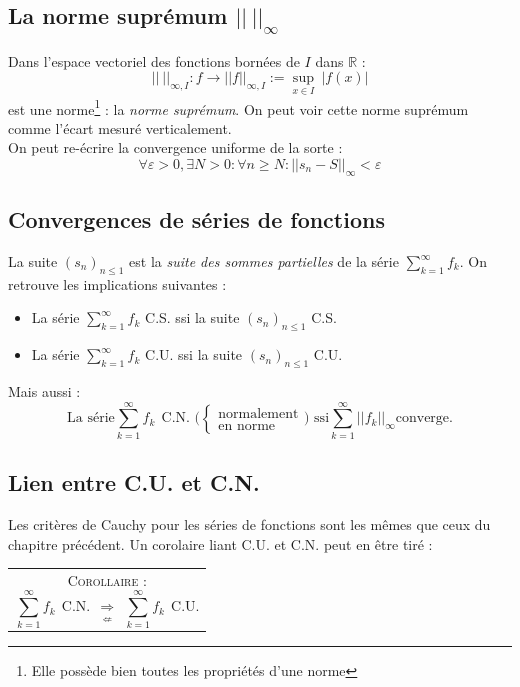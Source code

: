 \documentclass	[11pt, a4paper, openany]{book}
\newcommand{\corollaire}[1]{\ \\\begin{tabular}{|c}
\begin{minipage}{\textwidth}
  \textsc{Corollaire : } \textit{#1}
\end{minipage}
\end{tabular}}
\newcommand{\serie}{\sum_{k=1}^\infty}
\begin{document}
\subsection{La norme suprémum $||\ ||_\infty$}
Dans l'espace vectoriel des fonctions bornées de $I$ dans $\mathbb{R}$ :
\begin{equation}
||\ ||_{\infty, I} : f \rightarrow ||f||_{\infty, I} := \sup\limits_{x \in I}\ |f(x)|
\end{equation}
est une norme\footnote{Elle possède bien toutes les propriétés d'une norme} : la \textit{norme suprémum}. On peut voir cette norme suprémum comme l'écart mesuré verticalement. \\
On peut re-écrire la convergence uniforme de la sorte :
\begin{equation}
\forall \varepsilon > 0, \exists N >0: \forall n \geq N :  ||s_n - S||_\infty < \varepsilon
\end{equation}

\setcounter{subsection}{4}
\subsection{Convergences de séries de fonctions}
La suite $(s_n)_{n\leq 1}$ est la \textit{suite des sommes partielles} de la série $\serie f_k$. On retrouve les implications suivantes :
\begin{itemize}
\item La série $\serie f_k$ C.S. ssi la suite $(s_n)_{n\leq 1}$ C.S.
\item La série $\serie f_k$ C.U. ssi la suite $(s_n)_{n\leq 1}$ C.U. 
\end{itemize}
Mais aussi :
\begin{equation}
\text{La série} \serie f_k\ \ \text{C.N. ($\left\{\begin{array}{l}
\text{normalement}\\
\text{en norme}
\end{array}\right.$) ssi} \serie ||f_k||_\infty \text{converge}.
\end{equation}

\setcounter{subsection}{6}
\subsection{Lien entre C.U. et C.N.}
Les critères de Cauchy pour les séries de fonctions sont les mêmes que ceux du chapitre précédent. Un corolaire liant C.U. et C.N. peut en être tiré :
\corollaire{\begin{equation}
\serie f_k\ \ \text{C.N.}\ \ \underset{\nLeftarrow}{\Rightarrow}\ \ \serie f_k\ \ \text{C.U.}
\end{equation}}
\end{document}

